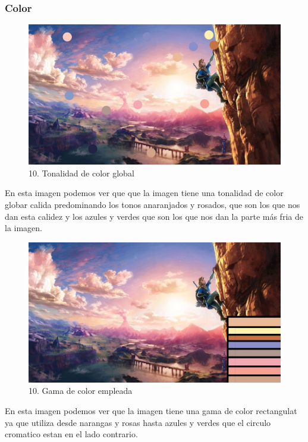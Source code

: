 \documentclass[12pt]{article}
\begin{document}
    \subsubsection{Color}
    \begin{figure}[H]
      \centering
      \includegraphics[width=\textwidth]{images/Selena/10_concept_art color.jpg}
      \caption{\small 10. Tonalidad de color global}
    \end{figure}
    En esta imagen podemos ver que que la imagen tiene una tonalidad de color globar calida predominando los tonos anaranjados y rosados, que son los que nos dan esta calidez y los azules y verdes que son los que nos dan la parte más fria de la imagen.  
    \begin{figure}[H]
      \centering
      \includegraphics[width=\textwidth]{images/Selena/10_concept_art paleta.jpg}
      \caption{\small 10. Gama de color empleada}
    \end{figure}
    En esta imagen podemos ver que la imagen tiene una gama de color rectangulat ya que utiliza desde narangas y rosas hasta azules y verdes que el circulo cromatico estan en el lado contrario. 
\end{document}
